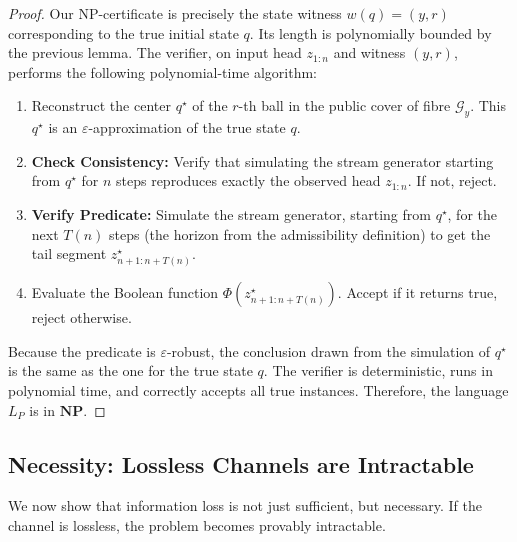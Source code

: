 \documentclass[12pt]{article}
\theoremstyle{definition}
\theoremstyle{plain}
\begin{document}
\begin{proof}
Our NP-certificate is precisely the state witness $w(q)=(y,r)$ corresponding to the true initial state $q$. Its length is polynomially bounded by the previous lemma. The verifier, on input head $z_{1:n}$ and witness $(y,r)$, performs the following polynomial-time algorithm:
\begin{enumerate}
  \item Reconstruct the center $q^\star$ of the $r$-th ball in the public cover of fibre $\mathcal{G}_y$. This $q^\star$ is an $\varepsilon$-approximation of the true state $q$.
  \item \textbf{Check Consistency:} Verify that simulating the stream generator starting from $q^\star$ for $n$ steps reproduces exactly the observed head $z_{1:n}$. If not, reject.
  \item \textbf{Verify Predicate:} Simulate the stream generator, starting from $q^\star$, for the next $T(n)$ steps (the horizon from the admissibility definition) to get the tail segment $z^\star_{n+1:n+T(n)}$.
  \item Evaluate the Boolean function $\Phi(z^\star_{n+1:n+T(n)})$. Accept if it returns true, reject otherwise.
\end{enumerate}
Because the predicate is $\varepsilon$-robust, the conclusion drawn from the simulation of $q^\star$ is the same as the one for the true state $q$. The verifier is deterministic, runs in polynomial time, and correctly accepts all true instances. Therefore, the language $L_P$ is in $\mathbf{NP}$.
\end{proof}

\subsection{Necessity: Lossless Channels are Intractable}
We now show that information loss is not just sufficient, but necessary. If the channel is lossless, the problem becomes provably intractable.
\end{document}
